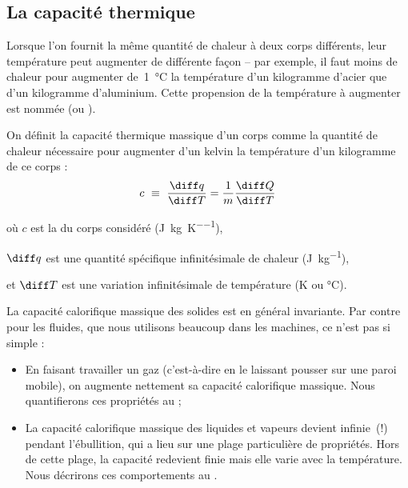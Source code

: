 	\subsection{La capacité thermique}
	\label{ch_capacite_thermique}

		Lorsque l’on fournit la même quantité de chaleur à deux corps différents, leur température peut augmenter de différente façon -- par exemple, il faut moins de chaleur pour augmenter de~\SI{1}{\degreeCelsius} la température d’un \si{kilogramme} d’acier que d’un \si{kilogramme} d’aluminium. Cette propension de la température à augmenter est nommée  (ou ).

		On définit la capacité thermique massique d’un corps comme la quantité de chaleur nécessaire pour augmenter d’un \si{kelvin} la température d’un \si{kilogramme} de ce corps :
		\begin{equation}
			c\ \equiv \ \frac{\diff q}{\diff T} = \frac{1}{m} \frac{\diff Q}{\diff T}
			\label{eq_def_capacité_calorifique_massique}
		\end{equation}

		\begin{equationterms}
			\item où \tab $c$			\tab\tab est la  du corps considéré (\si{\joule\per\kilogram\per\kelvin}),
			\item 	\tab $\diff q$ \tab est une quantité spécifique infinitésimale de chaleur (\si{\joule\per\kilogram}),
			\item et \tab $\diff T$ \tab est une variation infinitésimale de température (\si{\kelvin} ou \si{\degreeCelsius}).
		\end{equationterms}

		La capacité calorifique massique des solides est en général invariante. Par contre pour les fluides, que nous utilisons beaucoup dans les machines, ce n’est pas si simple :

		\begin{itemize}

			\item En faisant travailler un gaz (c’est-à-dire en le laissant pousser sur une paroi mobile), on augmente nettement sa capacité calorifique massique. Nous quantifierons ces propriétés au \coursquatre ;

			\item La capacité calorifique massique des liquides et vapeurs devient infinie~(!) pendant l’ébullition, qui a lieu sur une plage particulière de propriétés. Hors de cette plage, la capacité redevient finie mais elle varie avec la température. Nous décrirons ces comportements au \courscinq.

		\end{itemize}

